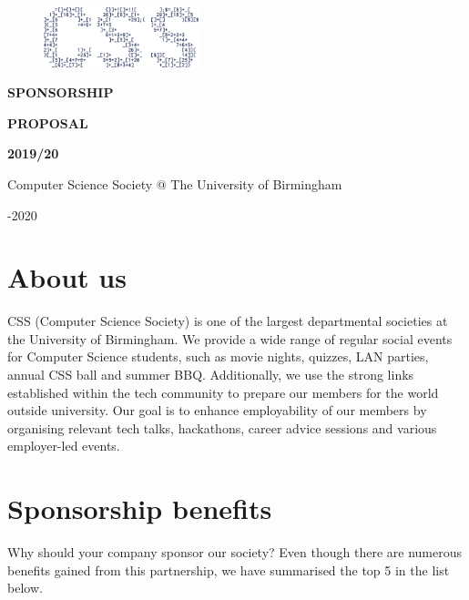 \documentclass{article}
\begin{document}
\begin{figure}
  \includegraphics[width=0.4\textwidth]{CSS_Logo}
\end{figure}

\vspace*{0.1cm}

\fontsize{56}{50}\selectfont

\noindent\textbf{SPONSORSHIP}

\par

\noindent\textbf{PROPOSAL}

\par

\noindent\textbf{2019/20}

\fontsize{13}{18}\selectfont

\vspace{0.5cm}

\noindent Computer Science Society @ The University of Birmingham 

-2020

\vspace{1cm}

\section*{About us}

CSS (Computer Science Society) is one of the largest departmental societies at the University of Birmingham.
We provide a wide range of regular social events  for Computer Science students, such as movie nights, quizzes, LAN parties, annual CSS ball and summer BBQ.
Additionally, we use the strong links established within the tech community to prepare our members for the world outside university.
Our goal is to enhance employability of our members by organising relevant tech talks, hackathons, career advice sessions and various employer-led events.

\newpage

\section*{Sponsorship benefits}

Why should your company sponsor our society?
Even though there are numerous benefits gained from this partnership, we have summarised the top 5 in the list below.
\end{document}
